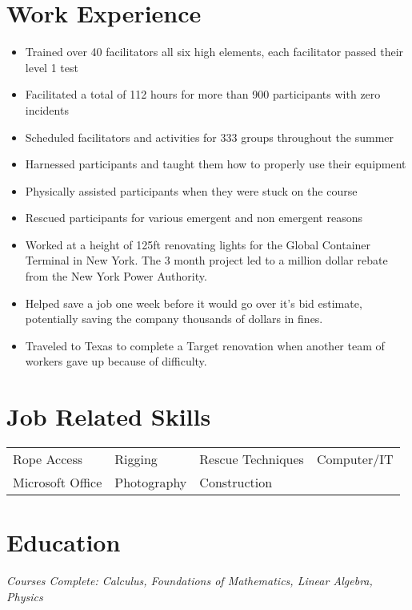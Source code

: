 \documentclass{my_resume}
\begin{document}
	\centerheader
	\section{Work Experience}
	
			\begin{itemize}
				\item Trained over 40 facilitators all six high elements, each facilitator passed their level 1 test
				\item Facilitated a total of 112 hours for more than 900 participants with zero incidents
				\item Scheduled facilitators and activities for 333 groups throughout the summer
			\end{itemize}
	
			\begin{itemize}
				\item Harnessed participants and taught them how to properly use their equipment
				\item Physically assisted participants when they were stuck on the course
				\item Rescued participants for various emergent and non emergent reasons
			\end{itemize}
	
			\begin{itemize}
				\item Worked at a height of 125ft renovating lights for the Global Container Terminal in New York. The 3 month project led to a million dollar rebate from the New York Power Authority.
				\item Helped save a job one week before it would go over it's bid estimate, potentially saving the company thousands of dollars in fines.
				\item Traveled to Texas to complete a Target renovation when another team of workers gave up because of difficulty.
			\end{itemize}

	\section{Job Related Skills}
		\setlength{\tabcolsep}{14pt}
		\begin{tabular}{L L L L}
			Rope Access & Rigging & Rescue Techniques & Computer/IT \\
			Microsoft Office & Photography & Construction
		\end{tabular}
	
	\section{Education}
		\scriptsize{\textit{Courses Complete: Calculus, Foundations of Mathematics, Linear Algebra, Physics}}
\end{document}
